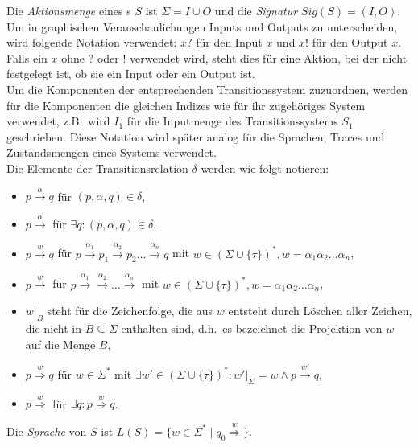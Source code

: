 Die \emph{Aktionsmenge} eines \EIO{}s $S$ ist $\Sigma = I\cup O$ und die
\emph{Signatur} $Sig(S)=(I,O)$.\\
Um in graphischen Veranschaulichungen Inputs und Outputs zu unterscheiden, wird
folgende Notation verwendet: $x?$ für den Input $x$ und $x!$ für den Output
$x$. Falls ein $x$ ohne $?$ oder $!$ verwendet wird, steht dies für eine
Aktion, bei der nicht festgelegt ist, ob sie ein Input oder ein Output ist.\\
Um die Komponenten der entsprechenden Transitionssystem zuzuordnen, werden für
die Komponenten die gleichen Indizes wie für ihr zugehöriges System verwendet,
z.B.\ wird $I_1$ für die Inputmenge des Transitionssystems $S_1$ geschrieben. Diese
Notation wird später analog für die Sprachen, Traces und Zustandsmengen eines
Systems verwendet.\\
Die Elemente der Transitionsrelation $\delta$ werden wie folgt notieren:
\begin{itemize}
  \item $p\overset{\alpha}{\rightarrow} q$ für $(p,\alpha ,q)\in\delta$,
  \item $p\overset{\alpha}{\rightarrow}$ für $\exists q: (p,\alpha ,q)\in\delta$,
  \item $p\overset{w}{\rightarrow} q$ für $p \overset{\alpha _1}{\rightarrow}
    p_1 \overset{\alpha _2}{\rightarrow} p_2\dots \overset{\alpha
    _n}{\rightarrow} q$ mit $w\in (\Sigma\cup\{\tau\})^*, w=\alpha _1\alpha
    _2\dots \alpha _n$,
  \item $p\overset{w}{\rightarrow}$ für $p \overset{\alpha _1}{\rightarrow}
    \overset{\alpha _2}{\rightarrow} \dots \overset{\alpha _n}{\rightarrow}$
    mit $w\in (\Sigma\cup\{\tau\})^*, w=\alpha _1\alpha _2\dots \alpha _n$,
  \item $w|_B$ steht für die Zeichenfolge, die aus $w$ entsteht durch Löschen
    aller Zeichen, die nicht in $B\subseteq\Sigma$ enthalten sind, d.h.\ es
    bezeichnet die Projektion von $w$ auf die Menge $B$,
  \item $p\overset{w}{\Rightarrow} q$ für $w\in\Sigma^*$ mit $\exists
    w'\in(\Sigma\cup\{\tau\})^*:w'|_{\Sigma}=w\wedge p\overset{w'}{\rightarrow}
    q$,
  \item $p\overset{w}{\Rightarrow}$ für $\exists q:p\overset{w}{\Rightarrow}
    q$.
\end{itemize}
Die \emph{Sprache} von $S$ ist
$L(S)=\{w\in\Sigma^*\mid q_0\overset{w}{\Rightarrow}\}$.

